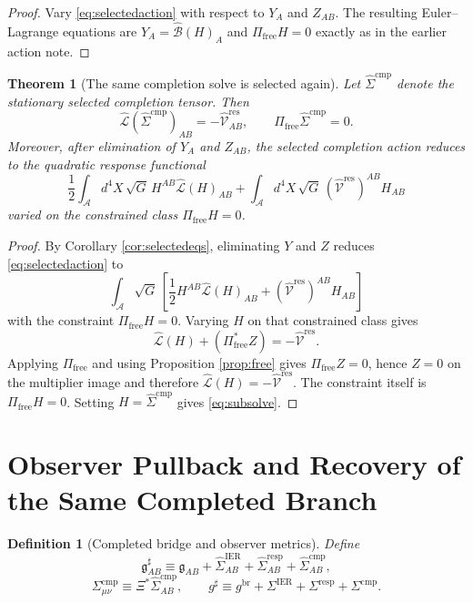 \documentclass[11pt]{article}
\newcommand{\Sub}{\mathcal A}
\newcommand{\ObserverMap}{\Xi}
\newcommand{\BridgeMetric}{\mathfrak g}
\newcommand{\ObserverMetric}{g^{\mathrm{br}}}
\newcommand{\CompletedMetric}{g^{\sharp}}
\newcommand{\BaseShift}{\Sigma^{\mathrm{IER}}}
\newcommand{\ResponseShift}{\Sigma^{\mathrm{resp}}}
\newcommand{\CompShift}{\Sigma^{\mathrm{cmp}}}
\newcommand{\BaseLift}{\widehat\Sigma^{\mathrm{IER}}}
\newcommand{\ResponseLift}{\widehat\Sigma^{\mathrm{resp}}}
\newcommand{\CompLift}{\widehat\Sigma^{\mathrm{cmp}}}
\newcommand{\ResidualLift}{\widehat{\mathcal V}^{\mathrm{res}}}
\newcommand{\SubGaugeVec}{\widehat{\mathcal B}}
\newcommand{\SubReducedEin}{\widehat{\mathcal L}}
\newcommand{\FreeProj}{\Pi_{\mathrm{free}}}
\newcommand{\GaugeAux}{Y}
\newcommand{\ModeAux}{Z}
\newtheorem{definition}{Definition}
\newtheorem{theorem}{Theorem}
\begin{document}
\begin{proof}
Vary \eqref{eq:selectedaction} with respect to \(\GaugeAux_A\) and \(\ModeAux_{AB}\). The resulting Euler--Lagrange equations are \(\GaugeAux_A=\SubGaugeVec(H)_A\) and \(\FreeProj H=0\) exactly as in the earlier action note.
\end{proof}

\begin{theorem}[The same completion solve is selected again]
\label{thm:solve}
Let \(\CompLift\) denote the stationary selected completion tensor. Then
\begin{equation}
\SubReducedEin(\CompLift)_{AB}
=
-\ResidualLift_{AB},
\qquad
\FreeProj\CompLift=0.
\label{eq:subsolve}
\end{equation}
Moreover, after elimination of \(\GaugeAux_A\) and \(\ModeAux_{AB}\), the selected completion action reduces to the quadratic response functional
\begin{equation}
\frac12
\int_{\Sub} d^4X\,\sqrt{G}\,
H^{AB}\SubReducedEin(H)_{AB}
+
\int_{\Sub} d^4X\,\sqrt{G}\,
(\ResidualLift)^{AB}H_{AB}
\label{eq:functional}
\end{equation}
varied on the constrained class \(\FreeProj H=0\).
\end{theorem}

\begin{proof}
By Corollary \ref{cor:selectedeqs}, eliminating \(\GaugeAux\) and \(\ModeAux\) reduces \eqref{eq:selectedaction} to
\[
\int_{\Sub}\sqrt{G}\,
\left[
\frac12 H^{AB}\SubReducedEin(H)_{AB}
+(\ResidualLift)^{AB}H_{AB}
\right]
\]
with the constraint \(\FreeProj H=0\). Varying \(H\) on that constrained class gives
\[
\SubReducedEin(H)+(\FreeProj^\ast \ModeAux)=-\ResidualLift.
\]
Applying \(\FreeProj\) and using Proposition \ref{prop:free} gives \(\FreeProj\ModeAux=0\), hence \(\ModeAux=0\) on the multiplier image and therefore \(\SubReducedEin(H)=-\ResidualLift\). The constraint itself is \(\FreeProj H=0\). Setting \(H=\CompLift\) gives \eqref{eq:subsolve}.
\end{proof}

\section{Observer Pullback and Recovery of the Same Completed Branch}

\begin{definition}[Completed bridge and observer metrics]
\label{def:completed}
Define
\begin{equation}
\BridgeMetric_{AB}^{\sharp}
\equiv
\BridgeMetric_{AB}
+\BaseLift_{AB}
+\ResponseLift_{AB}
+\CompLift_{AB},
\label{eq:bridgecompleted}
\end{equation}
\begin{equation}
\CompShift_{\mu\nu}
\equiv
\ObserverMap^*\CompLift_{AB},
\qquad
\CompletedMetric
\equiv
\ObserverMetric+\BaseShift+\ResponseShift+\CompShift.
\label{eq:defsigma}
\end{equation}
\end{definition}
\end{document}

